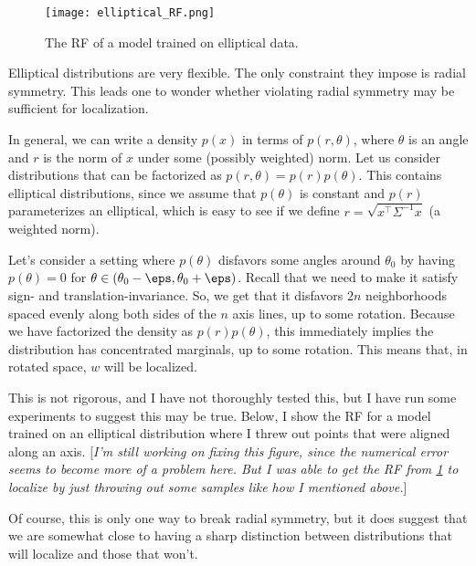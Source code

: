 \begin{figure}[!ht]
    \centering
    \texttt{[image: elliptical\_RF.png]}
    \caption{The RF of a model trained on elliptical data.}
    \label{fig:ellipse_rf}
\end{figure}

Elliptical distributions are very flexible.
The only constraint they impose is radial symmetry.
This leads one to wonder whether violating radial symmetry may be sufficient for localization.

In general, we can write a density $p(x)$ in terms of $p(r, \theta)$, where $\theta$ is an angle and $r$ is the norm of $x$ under some (possibly weighted) norm.
Let us consider distributions that can be factorized as $p(r, \theta) = p(r) p(\theta)$.
This contains elliptical distributions, since we assume that $p(\theta)$ is constant and $p(r)$ parameterizes an elliptical, which is easy to see if we define $r = \sqrt{x^\top \Sigma^{-1} x}$ (a weighted norm).

Let's consider a setting where $p(\theta)$ disfavors some angles around $\theta_0$ by having $p(\theta) = 0$ for $\theta \in (\theta_0-\eps,\theta_0+\eps)$.
Recall that we need to make it satisfy sign- and translation-invariance.
So, we get that it disfavors $2n$ neighborhoods spaced evenly along both sides of the $n$ axis lines, up to some rotation.
Because we have factorized the density as $p(r) p(\theta)$, this immediately implies the distribution has concentrated marginals, up to some rotation.
This means that, in rotated space, $w$ will be localized.

This is not rigorous, and I have not thoroughly tested this, but I have run some experiments to suggest this may be true.
Below, I show the RF for a model trained on an elliptical distribution where I threw out points that were aligned along an axis.
[\emph{I'm still working on fixing this figure, since the numerical error seems to become more of a problem here. But I was able to get the RF from \cref{fig:ellipse_rf} to localize by just throwing out some samples like how I mentioned above.}]

Of course, this is only one way to break radial symmetry, but it does suggest that we are somewhat close to having a sharp distinction between distributions that will localize and those that won't.


